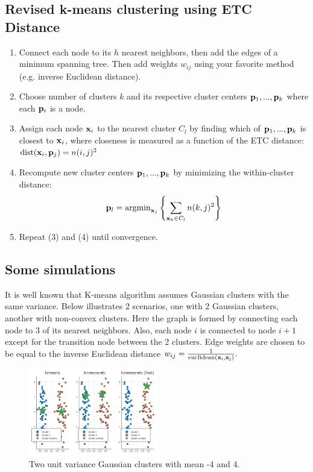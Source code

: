 \documentclass[./some_latex_template.tex]{subfiles}
\begin{document}
\subsection{Revised k-means clustering using ETC Distance}

\begin{enumerate}
	\item Connect each node to its $h$ nearest neighbors, then add the edges of a minimum spanning tree. Then add weights $w_{ij}$ using your favorite method (e.g. inverse Euclidean distance). 
	\item Choose number of clusters $k$ and its respective cluster centers $\mathbf{p}_1,...,\mathbf{p}_k$ where each $\mathbf{p}_i$ is a node.
	\item Assign each node $\mathbf{x}_i$ to the nearest cluster $C_l$ by finding which of $\mathbf{p}_1,...,\mathbf{p}_k$ is closest to $\mathbf{x}_i$, where closeness is measured as a function of the ETC distance: $\mathop{\rm dist}\nolimits(\mathbf{x}_i, \mathbf{p}_j) = n(i, j)^2$ 
	\item Recompute new cluster centers $\mathbf{p}_1,...,\mathbf{p}_k$ by minimizing the within-cluster distance:
	\begin{align*}
		\mathbf{p}_l = \mathop{\rm argmin}\nolimits_{\mathbf{x}_j} \left\{ \sum_{\mathbf{x}_k \in C_l}n(k, j)^2 \right\}
	\end{align*}
	\item Repeat (3) and (4) until convergence. 
\end{enumerate}

\subsection{Some simulations}

It is well known that K-means algorithm assumes Gaussian clusters with the same variance. Below illustrates 2 scenarios, one with 2 Gaussian clusters, another with non-convex clusters. Here the graph is formed by connecting each node to 3 of its nearest neighbors. Also, each node $i$ is connected to node $i + 1$ except for the transition node between the 2 clusters. Edge weights are chosen to be equal to the inverse Euclidean distance $w_{ij} = \frac{1}{\rm euclidean(\mathbf{x}_i, \mathbf{x}_j)}.$

\begin{figure}[H]
	\centering    
    \includegraphics[width=0.5\textwidth]{figures/convex.png}
    \caption{Two unit variance Gaussian clusters with mean -4 and 4.}
\end{figure}
\end{document}
